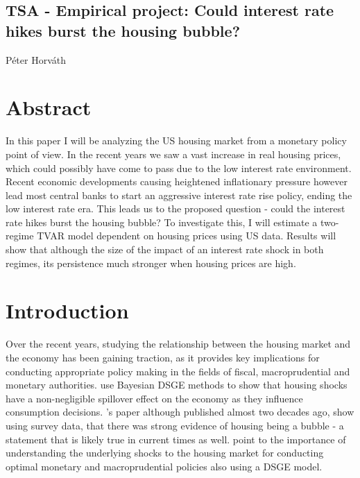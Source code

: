 \documentclass[12pt,a4paper]{article}
\begin{document}
	\begin{center}
		\section*{TSA - Empirical project: Could interest rate hikes burst the housing bubble?}
		Péter Horváth	
	\end{center}
\section*{Abstract}
In this paper I will be analyzing the US housing market from a monetary policy point of view. In the recent years we saw a vast increase in real housing prices, which could possibly have come to pass due to the low interest rate environment. Recent economic developments causing heightened inflationary pressure however lead most central banks to start an aggressive interest rate rise policy, ending the low interest rate era. This leads us to the proposed question - could the interest rate hikes burst the housing bubble? To investigate this, I will estimate a two-regime TVAR model dependent on housing prices using US data. Results will show that although the size of the impact of an interest rate shock  in both regimes, its persistence much stronger when housing prices are high.



\pagebreak

\section{Introduction}
Over the recent years, studying the relationship between the housing market and the economy has been gaining traction, as it provides key implications for conducting appropriate policy making in the fields of fiscal, macroprudential and monetary authorities. \textcolor{blue}{\cite{iacoviello2007}} use Bayesian DSGE methods to show that housing shocks have a non-negligible spillover effect on the economy as they influence consumption decisions. \textcolor{blue}{\cite{schiller2003}}'s paper although published almost two decades ago, show using survey data, that there was strong evidence of housing being a bubble - a statement that is likely true in current times as well. \textcolor{blue}{\cite{dsgemacroprud}} point to the importance of understanding the underlying shocks to the housing market for conducting optimal monetary and macroprudential policies also using a DSGE model.\\
\end{document}
